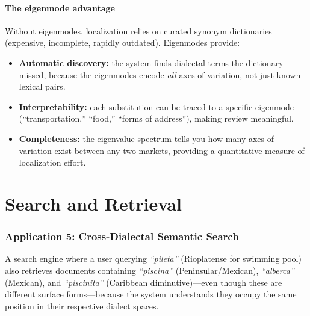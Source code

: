 \documentclass[11pt,a4paper]{article}
\begin{document}
\subsection{The eigenmode advantage}

Without eigenmodes, localization relies on curated synonym dictionaries
(expensive, incomplete, rapidly outdated). Eigenmodes provide:
\begin{itemize}[nosep]
  \item \textbf{Automatic discovery:} the system finds dialectal
    terms the dictionary missed, because the eigenmodes encode
    \emph{all} axes of variation, not just known lexical pairs.
  \item \textbf{Interpretability:} each substitution can be traced
    to a specific eigenmode (``transportation,'' ``food,''
    ``forms of address''), making review meaningful.
  \item \textbf{Completeness:} the eigenvalue spectrum tells you how
    many axes of variation exist between any two markets, providing a
    quantitative measure of localization effort.
\end{itemize}

\part{Search and Retrieval}

\section{Application 5: Cross-Dialectal Semantic Search}
\label{sec:app-search}

\begin{appbox}
A search engine where a user querying \emph{``pileta''} (Rioplatense
for swimming pool) also retrieves documents containing
\emph{``piscina''} (Peninsular/Mexican), \emph{``alberca''}
(Mexican), and \emph{``piscinita''} (Caribbean diminutive)---even
though these are different surface forms---because the system
understands they occupy the same position in their respective
dialect spaces.
\end{appbox}
\end{document}
